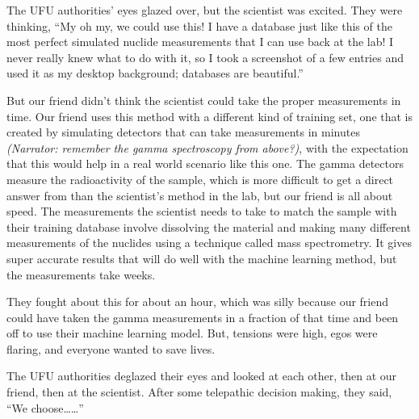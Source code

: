 {\begin{shadequote}
  The UFU authorities' eyes glazed over, but the scientist was excited. They
  were thinking, ``My oh my, we could use this! I have a database just like this
  of the most perfect simulated nuclide measurements that I can use back at the
  lab! I never really knew what to do with it, so I took a screenshot of a few
  entries and used it as my desktop background; databases are beautiful.''
  
  But our friend didn't think the scientist could take the proper measurements
  in time. Our friend uses this method with a different kind of training set,
  one that is created by simulating detectors that can take measurements in
  minutes \textit{(Narrator: remember the gamma spectroscopy from above?)},
  with the expectation that this would help in a real world scenario like this
  one. The gamma detectors measure the radioactivity of the sample, which is
  more difficult to get a direct answer from than the scientist's method in the
  lab, but our friend is all about speed. The measurements the scientist needs
  to take to match the sample with their training database involve dissolving
  the material and making many different measurements of the nuclides using a
  technique called mass spectrometry\footnotemark[8].  It gives super accurate
  results that will do well with the machine learning method, but the
  measurements take weeks. 
  
  They fought about this for about an hour, which was silly because our friend
  could have taken the gamma measurements in a fraction of that time and been
  off to use their machine learning model. But, tensions were high, egos were
  flaring, and everyone wanted to save lives. 
  
  The UFU authorities deglazed their eyes and looked at each other, then at our
  friend, then at the scientist. After some telepathic decision making, they
  said, ``We choose\ldots\ldots''

\end{shadequote}

}
